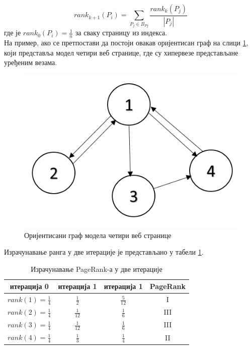 		\begin{equation}\label{eq:rank2}
		rank_{k+1}(P_{i})=\sum_{P_{j}\in B_{P{j}}}\frac{rank_{k}(P_{j})}{\left |P_{j}  \right |}
		\end{equation}
		где је $rank_{0}(P_{i})=\frac{1}{n}$ за сваку страницу из индекса.\\
		На пример, ако се претпостави да постоји овакав оријентисан граф на слици \ref{slike:graf}, који представља модел четири веб странице, где су хипервезе представљане уређеним везама. 
		\begin{figure}[here]
		\centering
		\includegraphics[scale=0.6]{graf.png}
		\caption{Оријентисани граф модела четири веб странице}
		\label{slike:graf}
		\end{figure}
		
		Израчунавање ранга у две итерације је представљано у табели \ref{tabele:rank}.
		\begin{table}[h]
		
		\centering
		\def\arraystretch{1.5}
		\begin{tabular}{|c|c|c|c|}\hline
		\textbf{итерација 0} & \textbf{итерација 1} & \textbf{итерација 1} & \textbf{PageRank}\\ \hline\hline
		$rank(1)=\frac{1}{4}$ & $\frac{1}{2}$ & $\frac{5}{12}$ & \textrm{I} \\ \hline
		$rank(2)=\frac{1}{4}$ & $\frac{1}{12}$ & $\frac{1}{6}$ & \textrm{III} \\ \hline
		$rank(3)=\frac{1}{4}$ & $\frac{1}{12}$ & $\frac{1}{6}$ & \textrm{III} \\ \hline
		$rank(4)=\frac{1}{4}$ & $\frac{1}{3}$ & $\frac{1}{4}$ &  \textrm{II}\\ \hline
		\end{tabular}
		
		\caption{Израчунавање PageRank-а у две итерације}
		\label{tabele:rank}
        \end{table}		
        \pagebreak
